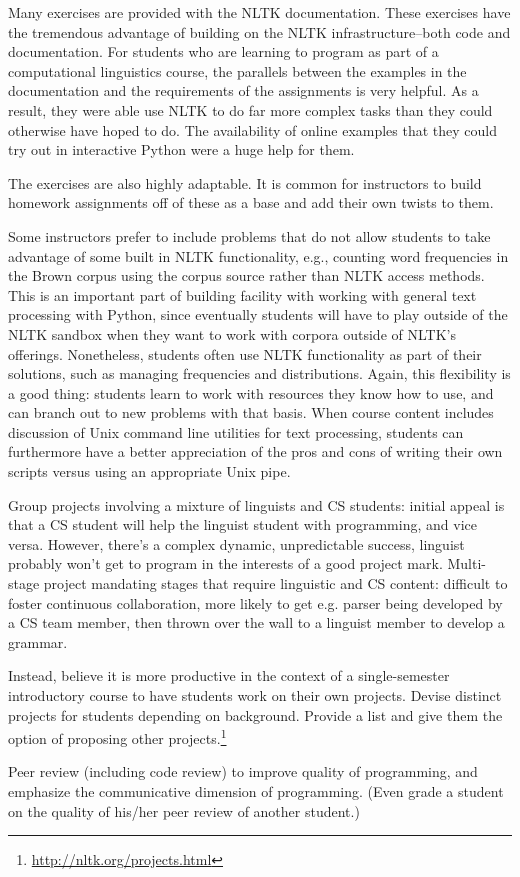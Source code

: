 \documentclass[11pt]{article}
\begin{document}
Many exercises are provided with the NLTK documentation. These
exercises have the tremendous advantage of building on the NLTK
infrastructure--both code and documentation. For students who are
learning to program as part of a computational linguistics course, the
parallels between the examples in the documentation and the
requirements of the assignments is very helpful. As a result, they
were able use NLTK to do far more complex tasks than they could
otherwise have hoped to do. The availability of online examples that
they could try out in interactive Python were a huge help for
them. 

The exercises are also highly adaptable. It is common for instructors
to build homework assignments off of these as a base and add their own
twists to them. 

Some instructors prefer to include problems that do not allow students
to take advantage of some built in NLTK functionality, e.g., counting
word frequencies in the Brown corpus using the corpus source rather
than NLTK access methods.  This is an important part of building
facility with working with general text processing with Python, since
eventually students will have to play outside of the NLTK sandbox when
they want to work with corpora outside of NLTK's
offerings. Nonetheless, students often use NLTK functionality as part
of their solutions, such as managing frequencies and
distributions. Again, this flexibility is a good thing: students learn
to work with resources they know how to use, and can branch out to new
problems with that basis. When course content includes discussion of
Unix command line utilities for text processing, students can
furthermore have a better appreciation of the pros and cons of writing
their own scripts versus using an appropriate Unix pipe.


Group projects involving a mixture of linguists and CS students:
initial appeal is that a CS student will help the linguist student with programming,
and vice versa.  However, there's a
complex dynamic, unpredictable success, linguist probably won't get to program
in the interests of a good project mark.
Multi-stage project mandating stages that require linguistic and CS content: difficult
to foster continuous collaboration, more likely to get e.g. parser being developed by
a CS team member, then thrown over the wall to a linguist member to develop a grammar.

Instead, believe it is more productive in the context of a single-semester introductory
course to have students work on their own projects.  Devise distinct projects for
students depending on background.  Provide a list and give them the option of proposing
other projects.\footnote{\url{http://nltk.org/projects.html}}

Peer review (including code review) to improve quality of programming, and
emphasize the communicative dimension of programming.
(Even grade a student on the quality of his/her peer review of another student.)






\end{document}
